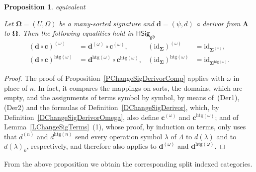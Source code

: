 \documentclass[a4paper, reqno]{amsbook}
\makeatletter
\newcommand{\sig}[1]{\mathbf{#1}}             %
\newcommand{\gd}{\mathfrak{gd}}              %
\newcommand{\htg}{\mathrm{htg}}                %
\newcommand{\id}{\mathrm{id}}
\theoremstyle{plain}
\newtheorem{proposition}[theorem]{Proposition}
\theoremstyle{definition}
\newcommand*{\CA@leanpending}{}
\newcommand*{\CA@leanrelation}{}
\newcommand*{\lean}[2]{%
  \ifcsname\string\color@lean@#1\endcsname\else
    \PackageError{main}{Unknown relation `#1' in \string\lean}{Use equivalent, weaker or stronger.}%
  \fi
  \gdef\CA@leanrelation{#1}%
  \gdef\CA@leanpending{#2}}
\makeatother
\begin{document}
\begin{proposition}\label{PChangeSigDerivorCompOmega}\lean{equivalent}{ChangeOfSignature.homogeneous_comp,ChangeOfSignature.homogeneous_identity,ChangeOfSignature.heterogeneous_comp,ChangeOfSignature.heterogeneous_identity}
Let $\sig{\Omega}=(U,\Omega)$ be a many-sorted signature and $\mathbf{d}=(\psi,d)$ a derivor from $\sig{\Lambda}$ to $\sig{\Omega}$.
Then the following equalities hold in $\mathsf{HSig}_{\gd}$
\begin{align*}
(\mathbf{d}\circ\mathbf{c})^{(\omega)}&=\mathbf{d}^{(\omega)}\circ\mathbf{c}^{(\omega)},
&
(\id_{\sig{\Sigma}})^{(\omega)}&=\id_{\sig{\Sigma}^{(\omega)}},
\\
(\mathbf{d}\circ\mathbf{c})^{\htg(\omega)}&=\mathbf{d}^{\htg(\omega)}\circ\mathbf{c}^{\htg(\omega)},
&
(\id_{\sig{\Sigma}})^{\htg(\omega)}&=\id_{\sig{\Sigma}^{\htg(\omega)}}.
\end{align*}
\end{proposition}
\begin{proof}
The proof of Proposition~\ref{PChangeSigDerivorComp} applies with $\omega$ in place of $n$.
In fact, it compares the mappings on sorts, the domains, which are empty, and the assignments of terms symbol by symbol, by means of~(Der1), (Der2) and the formulas of Definition~\ref{DChangeSigDerivor}, which, by Definition~\ref{DChangeSigDerivorOmega}, also define $\mathbf{c}^{(\omega)}$ and $\mathbf{c}^{\htg(\omega)}$; and of Lemma~\ref{LChangeSigTerms}~(1), whose proof, by induction on terms, only uses that $d^{(n)}$ and $d^{\htg(n)}$ send every operation symbol $\lambda$ of $\Lambda$ to $d(\lambda)$ and to $d(\lambda)_{k}$, respectively, and therefore also applies to $\mathbf{d}^{(\omega)}$ and $\mathbf{d}^{\htg(\omega)}$.
\end{proof}

From the above proposition we obtain the corresponding split indexed categories.
\end{document}
